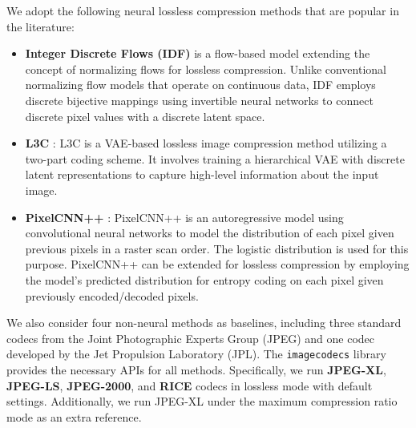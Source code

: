 We adopt the following neural lossless compression methods that are popular in the literature:

\begin{itemize}
    \item \textbf{Integer Discrete Flows (IDF)} is a flow-based model extending the concept of normalizing flows \citep{hoogeboom2019integer,rezende2015variational} for lossless compression. Unlike conventional normalizing flow models that operate on continuous data, IDF employs discrete bijective mappings using invertible neural networks to connect discrete pixel values with a discrete latent space.
    
    \item \textbf{L3C} \citet{mentzer2019practical}: L3C is a VAE-based lossless image compression method utilizing a two-part coding scheme. It involves training a hierarchical VAE with discrete latent representations to capture high-level information about the input image.
    
    \item \textbf{PixelCNN++} \citet{pixelcn}: PixelCNN++ is an autoregressive model using convolutional neural networks to model the distribution of each pixel given previous pixels in a raster scan order. The logistic distribution is used for this purpose. PixelCNN++ can be extended for lossless compression by employing the model's predicted distribution for entropy coding on each pixel given previously encoded/decoded pixels.
\end{itemize}

We also consider four non-neural methods as baselines, including three standard codecs from the Joint Photographic Experts Group (JPEG) and one codec developed by the Jet Propulsion Laboratory (JPL). The \texttt{imagecodecs} library provides the necessary APIs for all methods. Specifically, we run \textbf{JPEG-XL}, \textbf{JPEG-LS}, \textbf{JPEG-2000}, and \textbf{RICE} codecs in lossless mode with default settings. Additionally, we run JPEG-XL under the maximum compression ratio mode as an extra reference.


